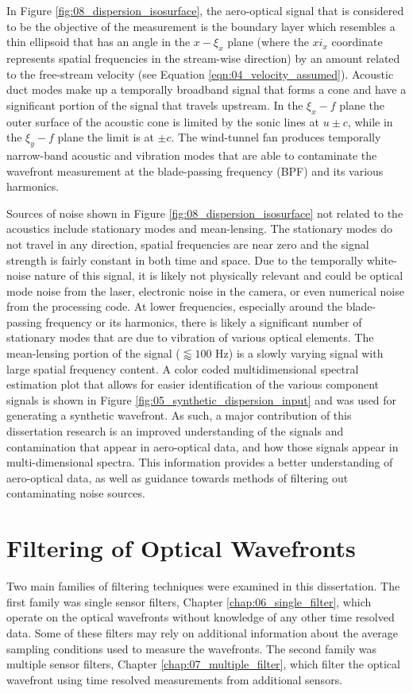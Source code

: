 In Figure \ref{fig:08_dispersion_isosurface}, the aero-optical signal that is considered to be the objective of the measurement is the boundary layer which resembles a thin ellipsoid that has an angle in the $x-\xi_x$ plane (where the $xi_x$ coordinate represents spatial frequencies in the stream-wise direction) by an amount related to the free-stream velocity (see Equation \ref{eqn:04_velocity_assumed}).
Acoustic duct modes make up a temporally broadband signal that forms a cone and have a significant portion of the signal that travels upstream.
In the $\xi_x-f$ plane the outer surface of the acoustic cone is limited by the sonic lines at $u\pm c$, while in the $\xi_y-f$ plane the limit is at $\pm c$.
The wind-tunnel fan produces temporally narrow-band acoustic and vibration modes that are able to contaminate the wavefront measurement at the blade-passing frequency (BPF) and its various harmonics.

Sources of noise shown in Figure \ref{fig:08_dispersion_isosurface} not related to the acoustics include stationary modes and mean-lensing.
The stationary modes do not travel in any direction, spatial frequencies are near zero and the signal strength is fairly constant in both time and space.
Due to the temporally white-noise nature of this signal, it is likely not physically relevant and could be optical mode noise from the laser, electronic noise in the camera, or even numerical noise from the processing code.
At lower frequencies, especially around the blade-passing frequency or its harmonics, there is likely a significant number of stationary modes that are due to vibration of various optical elements.
The mean-lensing portion of the signal ($\lessapprox 100$ Hz) is a slowly varying signal with large spatial frequency content.
A color coded multidimensional spectral estimation plot that allows for easier identification of the various component signals is shown in Figure \ref{fig:05_synthetic_dispersion_input} and was used for generating a synthetic wavefront.
As such, a major contribution of this dissertation research is an improved understanding of the signals and contamination that appear in aero-optical data, and how those signals appear in multi-dimensional spectra. This information provides a better understanding of aero-optical data, as well as guidance towards methods of filtering out contaminating noise sources.

\section{Filtering of Optical Wavefronts}
Two main families of filtering techniques were examined in this dissertation.
The first family was single sensor filters, Chapter \ref{chap:06_single_filter}, which operate on the optical wavefronts without knowledge of any other time resolved data.
Some of these filters may rely on additional information about the average sampling conditions used to measure the wavefronts.
The second family was multiple sensor filters, Chapter \ref{chap:07_multiple_filter}, which filter the optical wavefront using time resolved measurements from additional sensors.

